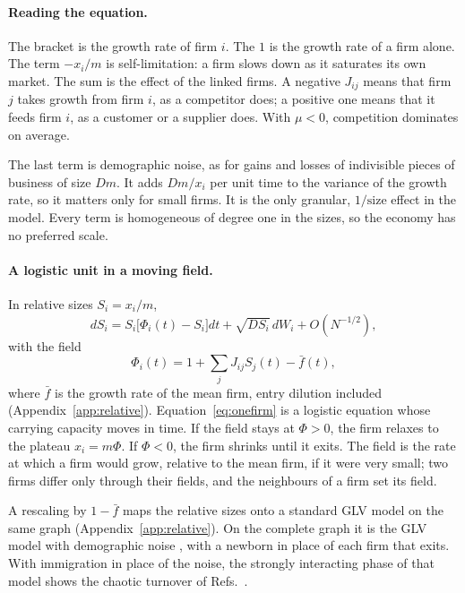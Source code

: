 \documentclass[pre,twocolumn,superscriptaddress,nofootinbib]{revtex4-2}
\begin{document}
\paragraph{Reading the equation.}  The bracket is the growth rate of firm $i$.  The $1$ is the growth rate of a
firm alone.  The term $-x_i/m$ is self-limitation: a firm slows down as it saturates its own market.  The sum is
the effect of the linked firms.  A negative $J_{ij}$ means that firm $j$ takes growth from firm $i$, as a
competitor does; a positive one means that it feeds firm $i$, as a customer or a supplier does.  With $\mu<0$,
competition dominates on average.

The last term is demographic noise, as for gains and losses of indivisible pieces of business of size $Dm$.  It
adds $Dm/x_i$ per unit time to the variance of the growth rate, so it matters only for small firms.  It is the
only granular, $1/\text{size}$ effect in the model.  Every term is homogeneous of degree one in the sizes, so the
economy has no preferred scale.

\paragraph{A logistic unit in a moving field.}  In relative sizes $S_i=x_i/m$,
\begin{equation}
dS_i=S_i\big[\Phi_i(t)-S_i\big]dt+\sqrt{DS_i}\,dW_i+O(N^{-1/2}),
\label{eq:onefirm}
\end{equation}
with the field
\begin{equation}
\Phi_i(t)=1+\sum_jJ_{ij}S_j(t)-\bar f(t),
\label{eq:field}
\end{equation}
where $\bar f$ is the growth rate of the mean firm, entry dilution included (Appendix~\ref{app:relative}).
Equation~\eqref{eq:onefirm} is a logistic equation whose carrying capacity moves in time.  If the field stays at
$\Phi>0$, the firm relaxes to the plateau $x_i=m\Phi$.  If $\Phi<0$, the firm shrinks until it exits.  The field is
the rate at which a firm would grow, relative to the mean firm, if it were very small; two firms differ only
through their fields, and the neighbours of a firm set its field.

A rescaling by $1-\bar f$ maps the relative sizes onto a standard GLV model on the same graph
(Appendix~\ref{app:relative}).  On the complete graph it is the GLV model with demographic noise
\cite{altieri2021}, with a newborn in place of each firm that exits.  With immigration in place of the noise, the
strongly interacting phase of that model shows the chaotic turnover of Refs.~\cite{roy2020,mallmin2024}.
\end{document}
